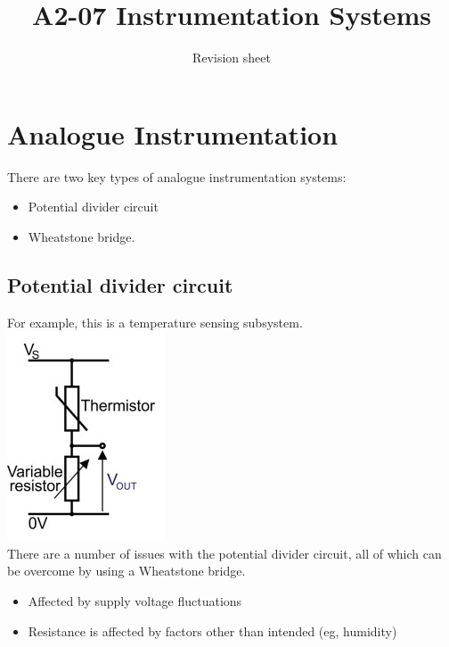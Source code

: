 \documentclass[a4paper, 11pt, twocolumn]{article}
\title{A2-07 Instrumentation Systems}
\author{Revision sheet}
\date{}
\begin{document}
    
    \maketitle
    \section{Analogue Instrumentation}
    \thispagestyle{fancy}
    There are two key types of analogue instrumentation systems:
    \begin{itemize}
        \item Potential divider circuit
        \item Wheatstone bridge.
    \end{itemize}
    \subsection{Potential divider circuit}
    For example, this is a temperature sensing subsystem.\\
    \includegraphics{simplePD.jpg} \\
    There are a number of issues with the potential divider circuit, all of which can be overcome by using a Wheatstone bridge.
    \begin{itemize}
        \item Affected by supply voltage fluctuations
        \item Resistance is affected by factors other than intended (eg, humidity)
    \end{itemize}
\end{document}
